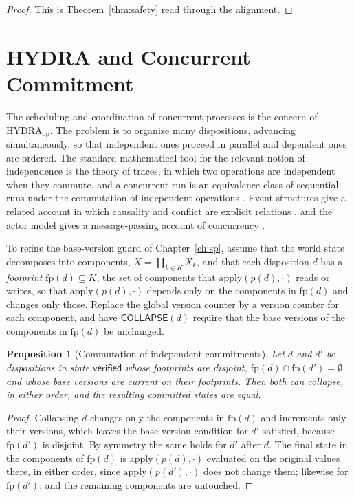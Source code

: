 \documentclass[11pt,twoside,openright]{book}
\theoremstyle{plain}
\newtheorem{proposition}[theorem]{Proposition}
\theoremstyle{definition}
\theoremstyle{remark}
\newcommand{\collapse}{\mathsf{COLLAPSE}}
\begin{document}
\begin{proof}
This is Theorem~\ref{thm:safety} read through the alignment.
\end{proof}

\section{HYDRA and Concurrent Commitment}

The scheduling and coordination of concurrent processes is the concern of HYDRA$_{\mathrm{op}}$. The problem is to organize many dispositions, advancing simultaneously, so that independent ones proceed in parallel and dependent ones are ordered. The standard mathematical tool for the relevant notion of independence is the theory of traces, in which two operations are independent when they commute, and a concurrent run is an equivalence class of sequential runs under the commutation of independent operations \cite{mazurkiewicz1977}. Event structures give a related account in which causality and conflict are explicit relations \cite{winskel1987}, and the actor model gives a message-passing account of concurrency \cite{hewitt1973}.

To refine the base-version guard of Chapter~\ref{ch:sp}, assume that the world state decomposes into components, $X=\prod_{k\in K}X_k$, and that each disposition $d$ has a \emph{footprint} $\mathrm{fp}(d)\subseteq K$, the set of components that $\mathrm{apply}(p(d),\cdot)$ reads or writes, so that $\mathrm{apply}(p(d),\cdot)$ depends only on the components in $\mathrm{fp}(d)$ and changes only those. Replace the global version counter by a version counter for each component, and have $\collapse(d)$ require that the base versions of the components in $\mathrm{fp}(d)$ be unchanged.

\begin{proposition}[Commutation of independent commitments]\label{prop:commute}
Let $d$ and $d'$ be dispositions in state $\mathsf{verified}$ whose footprints are disjoint, $\mathrm{fp}(d)\cap\mathrm{fp}(d')=\emptyset$, and whose base versions are current on their footprints. Then both can collapse, in either order, and the resulting committed states are equal.
\end{proposition}

\begin{proof}
Collapsing $d$ changes only the components in $\mathrm{fp}(d)$ and increments only their versions, which leaves the base-version condition for $d'$ satisfied, because $\mathrm{fp}(d')$ is disjoint. By symmetry the same holds for $d'$ after $d$. The final state in the components of $\mathrm{fp}(d)$ is $\mathrm{apply}(p(d),\cdot)$ evaluated on the original values there, in either order, since $\mathrm{apply}(p(d'),\cdot)$ does not change them; likewise for $\mathrm{fp}(d')$; and the remaining components are untouched.
\end{proof}
\end{document}
